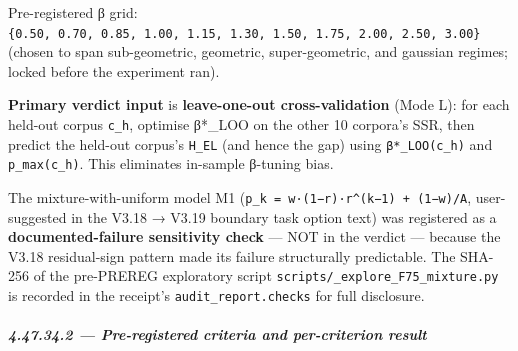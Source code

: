 \documentclass[
]{article}
\begin{document}
Pre-registered β grid:
\texttt{\{0.50,\ 0.70,\ 0.85,\ 1.00,\ 1.15,\ 1.30,\ 1.50,\ 1.75,\ 2.00,\ 2.50,\ 3.00\}}
(chosen to span sub-geometric, geometric, super-geometric, and gaussian
regimes; locked before the experiment ran).

\textbf{Primary verdict input} is \textbf{leave-one-out
cross-validation} (Mode L): for each held-out corpus \texttt{c\_h},
optimise β*\_LOO on the other 10 corpora's SSR, then predict the
held-out corpus's \texttt{H\_EL} (and hence the gap) using
\texttt{β*\_LOO(c\_h)} and \texttt{p\_max(c\_h)}. This eliminates
in-sample β-tuning bias.

The mixture-with-uniform model M1
(\texttt{p\_k\ =\ w·(1−r)·r\^{}(k−1)\ +\ (1−w)/A}, user-suggested in the
V3.18 → V3.19 boundary task option text) was registered as a
\textbf{documented-failure sensitivity check} --- NOT in the verdict ---
because the V3.18 residual-sign pattern made its failure structurally
predictable. The SHA-256 of the pre-PREREG exploratory script
\texttt{scripts/\_explore\_F75\_mixture.py} is recorded in the receipt's
\texttt{audit\_report.checks} for full disclosure.

\subparagraph{4.47.34.2 --- Pre-registered criteria and per-criterion
result}\label{pre-registered-criteria-and-per-criterion-result}
\end{document}
